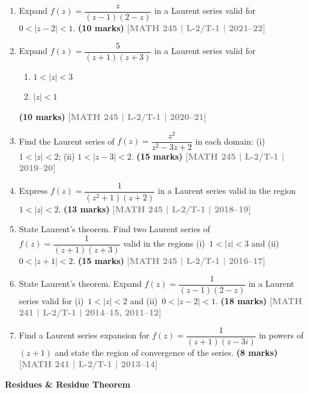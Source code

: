 \documentclass[12pt,a3paper]{article}
\newcommand{\yr}[1]{\hfill\textcolor{gray}{\small\textbf{[#1]}}}
\newcommand{\mk}[1]{\textcolor{orange!70!black}{\small\textbf{(#1 marks)}}}
\newcommand{\subtopic}[2]{%
  \vspace{10pt}
  \noindent\begin{tcolorbox}[colback=#1!8,colframe=#1,boxrule=0.6pt,arc=4pt,
    left=6pt,right=6pt,top=4pt,bottom=4pt]
    \small\bfseries\textcolor{#1}{#2}
  \end{tcolorbox}
  \vspace{2pt}
}
\begin{document}
\begin{enumerate}

\item Expand $f(z)=\dfrac{z}{(z-1)(2-z)}$ in a Laurent series valid for $0<|z-2|<1$.
\mk{10} \yr{MATH 245 | L-2/T-1 | 2021--22}


\item Expand $f(z)=\dfrac{5}{(z+1)(z+3)}$ in a Laurent series valid for
\begin{enumerate}
  \item $1<|z|<3$
  \item $|z|<1$
\end{enumerate}
\mk{10} \yr{MATH 245 | L-2/T-1 | 2020--21}


\item Find the Laurent series of $f(z)=\dfrac{z^{2}}{z^{2}-3z+2}$ in each domain: (i) $1<|z|<2$; (ii) $1<|z-3|<2$.
\mk{15} \yr{MATH 245 | L-2/T-1 | 2019--20}


\item Express $f(z)=\dfrac{1}{(z^{2}+1)(z+2)}$ in a Laurent series valid in the region $1<|z|<2$.
\mk{13} \yr{MATH 245 | L-2/T-1 | 2018--19}


\item State Laurent's theorem. Find two Laurent series of $f(z)=\dfrac{1}{(z+1)(z+3)}$ valid in the regions (i)~$1<|z|<3$ and (ii)~$0<|z+1|<2$.
\mk{15} \yr{MATH 245 | L-2/T-1 | 2016--17}


\item State Laurent's theorem. Expand $f(z)=\dfrac{1}{(z-1)(2-z)}$ in a Laurent series valid for (i)~$1<|z|<2$ and (ii)~$0<|z-2|<1$.
\mk{18} \yr{MATH 241 | L-2/T-1 | 2014--15, 2011--12}


\item Find a Laurent series expansion for $f(z)=\dfrac{1}{(z+1)(z-3i)}$ in powers of $(z+1)$ and state the region of convergence of the series.
\mk{8} \yr{MATH 241 | L-2/T-1 | 2013--14}


\end{enumerate}


\subtopic{cE}{Residues \& Residue Theorem}
\label{sub:s5-residue}
\end{document}
